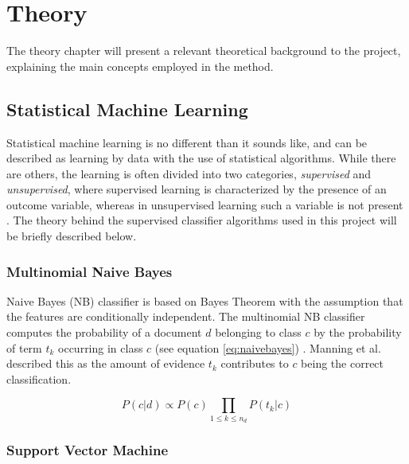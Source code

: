 \section{Theory}
\label{sec:theory}


The theory chapter will present a relevant theoretical background to the project, explaining the main concepts employed in the method.

\subsection{Statistical Machine Learning}

Statistical machine learning is no different than it sounds like, and can be described as learning by data with the use of statistical algorithms. While there are others, the learning is often divided into two categories, \textit{supervised} and \textit{unsupervised}, where supervised learning is characterized by the presence of an outcome variable, whereas in unsupervised learning such a variable is not present \cite{Hastie2009}. The theory behind the supervised classifier algorithms used in this project will be briefly described below.

\subsubsection{Multinomial Naive Bayes}

Naive Bayes (NB) classifier is based on Bayes Theorem with the assumption that the features are conditionally independent. The multinomial NB classifier computes the probability of a document $d$ belonging to class $c$ by the probability of term $t_k$ occurring in class $c$ (see equation \ref{eq:naivebayes}) \cite{Manning2008}. Manning et al. described this as the amount of evidence $t_k$ contributes to $c$ being the correct classification.

\begin{equation}
\label{eq:naivebayes}
P(c|d) \propto P(c) \prod_{1 \leq k \leq n_d} P(t_k|c)
\end{equation}

\subsubsection{Support Vector Machine}

